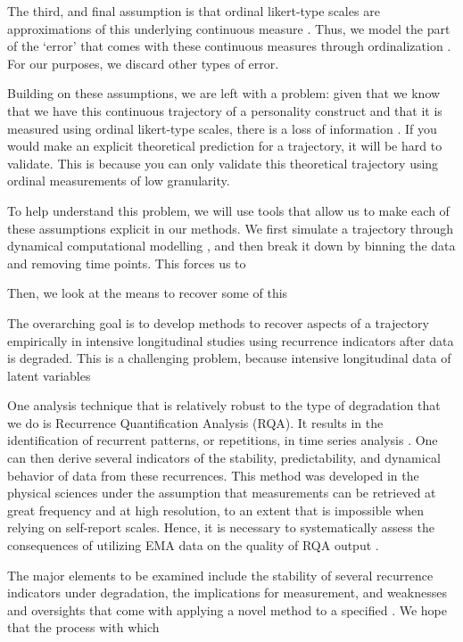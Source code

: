 \documentclass[utf8]{FrontiersinVancouver}
\begin{document}
The third, and final assumption is that ordinal likert-type scales are approximations of this underlying continuous measure \citep{haslbeckRecoveringWithinpersonDynamics2022}. Thus, we model the part of the `error' that comes with these continuous measures through ordinalization \citep{westlandInformationLossBias2022}. For our purposes, we discard other types of error. 

Building on these assumptions, we are left with a problem: given that we know that we have this continuous trajectory of a personality construct and that it is measured using ordinal likert-type scales, there is a loss of information \citep{haslbeckRecoveringWithinpersonDynamics2022}. If you would make an explicit theoretical prediction for a trajectory, it will be hard to validate. This is because you can only validate this theoretical trajectory using ordinal measurements of low granularity. 

To help understand this problem, we will use tools that allow us to make each of these assumptions explicit in our methods. We first simulate a trajectory through dynamical computational modelling \citep{grahekAnatomyPsychologicalTheory2021,gauldDynamicalSystemsComputational2023}, and then break it down by binning the data and removing time points. This forces us to 

Then, we look at the means to recover some of this 

The overarching goal is to develop methods to recover aspects of a trajectory empirically in intensive longitudinal studies using recurrence indicators after data is degraded. This is a challenging problem, because intensive longitudinal data of latent variables 

One analysis technique that is relatively robust to the type of degradation that we do is Recurrence Quantification Analysis (RQA). It results in the identification of recurrent patterns, or repetitions, in time series analysis \citep{webber2005recurrence}. One can then derive several indicators of the stability, predictability, and dynamical behavior of data from these recurrences. This method was developed in the physical sciences under the assumption that measurements can be retrieved at great frequency and at high resolution, to an extent that is impossible when relying on self-report scales. Hence, it is necessary to systematically assess the consequences of utilizing EMA data on the quality of RQA output \citep{haslbeckRecoveringWithinpersonDynamics2022}. 

The major elements to be examined include the stability of several recurrence indicators under degradation, the implications for measurement, and weaknesses and oversights that come with applying a novel method to a specified . We hope that the process with which 
\end{document}

